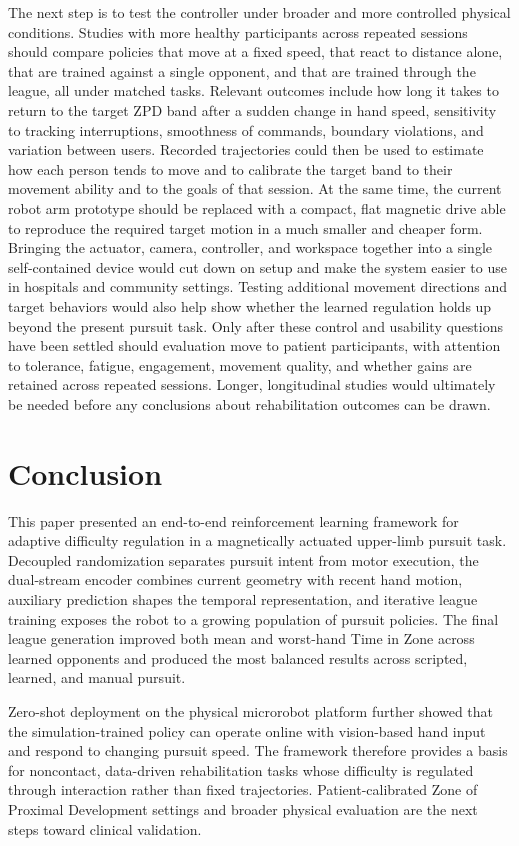 \documentclass[letterpaper,journal]{IEEEtran}
\begin{document}
The next step is to test the controller under broader and more controlled physical conditions. Studies with more healthy participants across repeated sessions should compare policies that move at a fixed speed, that react to distance alone, that are trained against a single opponent, and that are trained through the league, all under matched tasks. Relevant outcomes include how long it takes to return to the target ZPD band after a sudden change in hand speed, sensitivity to tracking interruptions, smoothness of commands, boundary violations, and variation between users. Recorded trajectories could then be used to estimate how each person tends to move and to calibrate the target band to their movement ability and to the goals of that session. At the same time, the current robot arm prototype should be replaced with a compact, flat magnetic drive able to reproduce the required target motion in a much smaller and cheaper form. Bringing the actuator, camera, controller, and workspace together into a single self-contained device would cut down on setup and make the system easier to use in hospitals and community settings. Testing additional movement directions and target behaviors would also help show whether the learned regulation holds up beyond the present pursuit task. Only after these control and usability questions have been settled should evaluation move to patient participants, with attention to tolerance, fatigue, engagement, movement quality, and whether gains are retained across repeated sessions. Longer, longitudinal studies would ultimately be needed before any conclusions about rehabilitation outcomes can be drawn.

\section{Conclusion}
This paper presented an end-to-end reinforcement learning framework for adaptive difficulty regulation in a magnetically actuated upper-limb pursuit task. Decoupled randomization separates pursuit intent from motor execution, the dual-stream encoder combines current geometry with recent hand motion, auxiliary prediction shapes the temporal representation, and iterative league training exposes the robot to a growing population of pursuit policies. The final league generation improved both mean and worst-hand Time in Zone across learned opponents and produced the most balanced results across scripted, learned, and manual pursuit.

Zero-shot deployment on the physical microrobot platform further showed that the simulation-trained policy can operate online with vision-based hand input and respond to changing pursuit speed. The framework therefore provides a basis for noncontact, data-driven rehabilitation tasks whose difficulty is regulated through interaction rather than fixed trajectories. Patient-calibrated Zone of Proximal Development settings and broader physical evaluation are the next steps toward clinical validation.
\end{document}
